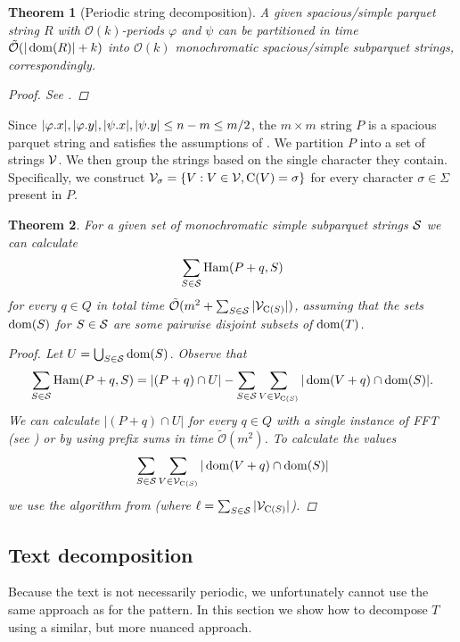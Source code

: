 \documentclass[11pt]{article}
\renewcommand{\O}{\mathcal{O}}
\newcommand{\tO}{\tilde{\mathcal{O}}}
\renewcommand{\phi}{\varphi}
\newcommand{\set}[1]{\left\lbrace #1 \right\rbrace}
\theoremstyle{plain}
\newtheorem{theorem}{Theorem}
\theoremstyle{definition}
\theoremstyle{remark}
\DeclareMathOperator*{\Ham}{Ham}
\begin{document}
\begin{theorem}[Periodic string decomposition]\label{parquet_decomposition}
	A given spacious/simple parquet string $R$ with $\O(k)$-periods $\phi$ and $\psi$ can be partitioned in time $\tO(|\d{R}| + k)$ into $\O(k)$ monochromatic spacious/simple subparquet strings, correspondingly.
	\begin{proof} See . \end{proof}
\end{theorem}


Since $|\x{\phi}|, |\y{\phi}|, |\x{\psi}|, |\y{\psi}| \le n - m \le m / 2$, the $m \times m$ string $P$ is a spacious parquet string and satisfies the assumptions of .
We partition $P$ into a set of strings $\V$.
We then group the strings based on the single character they contain.
Specifically, we construct $\V_\sigma = \set{V : V \in \V, \getchar{V} = \sigma}$ for every character $\sigma \in \Sigma$ present in $P$.


\begin{theorem}\label{sparse_algo}
	For a given set of monochromatic simple subparquet strings $\S$ we can calculate
	\[ \sum_{S \in \S} \Ham(P + q, S) \]
	for every $q \in Q$ in total time $\tO(m^2 + \sum_{S \in \S} |\V_{\getchar{S}}|)$, assuming that the sets $\d{S}$ for $S \in \S$ are some pairwise disjoint subsets of $\d{T}$.
	\begin{proof}
		Let $U = \bigcup_{S \in \S} \d{S}$. Observe that
		\[ \sum_{S \in \S} \Ham(P + q, S) = |(P + q) \cap U| - \sum_{S \in \S}\sum_{V \in \V_{\getchar{S}}} |\d{V + q} \cap \d{S}|.\]
		We can calculate $|(P + q) \cap U|$ for every $q \in Q$ with a single instance of FFT (see ) or by using prefix sums in time $\tO(m^2)$.
		To calculate the values
		\[ \sum_{S \in \S}\sum_{V \in \V_{\getchar{S}}} |\d{V + q} \cap \d{S}| \]
		we use the algorithm from  (where $\ell = \sum_{S \in \S} |\V_{\getchar{S}}|$).
	\end{proof}
\end{theorem}


\subsection{Text decomposition}
Because the text is not necessarily periodic, we unfortunately cannot use the same approach as for the pattern.
In this section we show how to decompose $T$ using a similar, but more nuanced approach.
\end{document}
